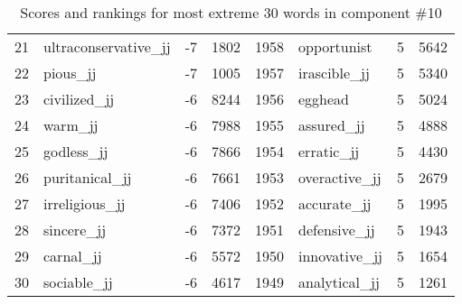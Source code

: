 \begin{table}[tbp]
\begin{tabular}{| rlr@{.}l | rlr@{.}l |}
    21 & ultraconservative\_jj & -7 & 1802    &    1958 & opportunist & 5 & 5642 \\
    22 & pious\_jj & -7 & 1005    &    1957 & irascible\_jj & 5 & 5340 \\
    23 & civilized\_jj & -6 & 8244    &    1956 & egghead & 5 & 5024 \\
    24 & warm\_jj & -6 & 7988    &    1955 & assured\_jj & 5 & 4888 \\
    25 & godless\_jj & -6 & 7866    &    1954 & erratic\_jj & 5 & 4430 \\
    26 & puritanical\_jj & -6 & 7661    &    1953 & overactive\_jj & 5 & 2679 \\
    27 & irreligious\_jj & -6 & 7406    &    1952 & accurate\_jj & 5 & 1995 \\
    28 & sincere\_jj & -6 & 7372    &    1951 & defensive\_jj & 5 & 1943 \\
    29 & carnal\_jj & -6 & 5572    &    1950 & innovative\_jj & 5 & 1654 \\
    30 & sociable\_jj & -6 & 4617    &    1949 & analytical\_jj & 5 & 1261 \\
    \hline
    \end{tabular}
    \caption{Scores and rankings for most extreme 30 words in component \#10} 
\end{table}
\clearpage
